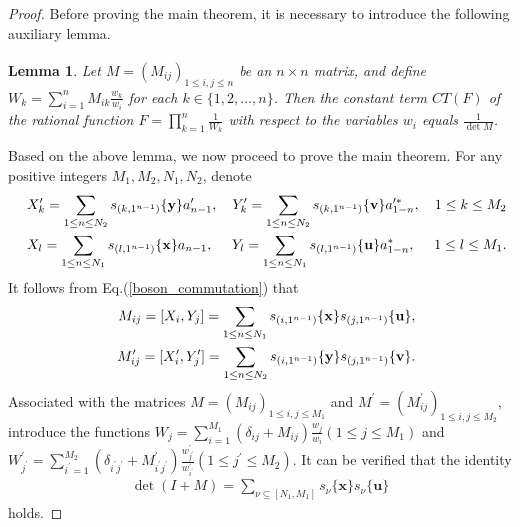 \documentclass[10pt,a4paper]{amsart}
\numberwithin{equation}{section}
\newtheorem{lemma}[theorem]{Lemma}
\begin{document}
\begin{proof}
Before proving the main theorem,  it is necessary to introduce the following auxiliary lemma.
\begin{lemma}\textsuperscript{\cite{bosoncorreclation}}
Let $M=(M_{ij})_{1\leq i,j\leq n}$ be an $n\times n$ matrix, and define $W_{k}=\sum\limits^{n}_{i=1}M_{ik}\frac{w_{k}}{w_{i}}$ for each $k\in\{1,2,\ldots,n\}$. Then the constant term $CT(F)$ of  the rational function $F=\prod\limits^{n}_{k=1}\frac{1}{W_{k}}$  with respect to the variables $w_{i}$ equals $\frac{1}{\det M}$.
\end{lemma}
Based on the above lemma, we now proceed to prove the main theorem. For any positive integers $M_{1}, M_{2},N_{1}, N_{2}$, denote
\begin{eqnarray}
&&X^{\prime}_{k}=\sum\limits_{1\leq n\leq N_{2}}s_{(k,1^{n-1})}\{\mathbf{y}\}a^{\prime}_{n-1},\quad Y^{\prime}_{k}=\sum\limits_{1\leq n\leq N_{2}}s_{(k,1^{n-1})}\{\mathbf{v}\}a^{\prime\ast}_{1-n}
,\quad 1\leq k\leq M_{2}\notag\\
&&X_{l}=\sum\limits_{1\leq n\leq N_{1}}s_{(l,1^{n-1})}\{\mathbf{x}\}a_{n-1},\quad \ Y_{l}=\sum\limits_{1\leq n\leq N_{1}}s_{(l,1^{n-1})}\{\mathbf{u}\}a^{\ast}_{1-n},\quad \ 1\leq l\leq M_{1}.
\end{eqnarray}
It follows from Eq.(\ref{boson_commutation}) that
\begin{eqnarray}
&&M_{ij}=[X_{i},Y_{j}]=\sum\limits_{1\leq n\leq N_{1}}s_{(i,1^{n-1})}\{\mathbf{x}\}s_{(j,1^{n-1})}\{\mathbf{u}\},\notag\\
&&M^{\prime}_{ij}=[X^{\prime}_{i},Y^{\prime}_{j}]=\sum\limits_{1\leq n\leq N_{2}}s_{(i,1^{n-1})}\{\mathbf{y}\}s_{(j,1^{n-1})}\{\mathbf{v}\}.
\end{eqnarray}
Associated with the matrices $M=(M_{ij})_{1\leq i,j\leq M_{1}}$ and $M^{\prime}=(M^{\prime}_{ij})_{1\leq i,j\leq M_{2}}$, introduce the functions
$W_{j}=\sum\limits^{M_{1}}_{i=1}\left(\delta_{ij}+M_{ij}\right)\frac{w_{j}}{w_{i}}(1\leq j\leq M_{1})$ and $W^{\prime}_{j^{\prime}}=\sum\limits^{M_{2}}_{i^{\prime}=1}
\left(\delta_{i^{\prime}j^{\prime}}+M^{\prime}_{i^{\prime}j^{\prime}}\right)
\frac{w^{\prime}_{j^{\prime}}}{w^{\prime}_{i^{\prime}}}(1\leq j^{\prime}\leq M_{2})$. It can be verified that the identity
\begin{eqnarray}
\det(I+M)=\sum\limits_{\nu\subseteq[N_{1},M_{1}]}s_{\nu}\{\mathbf{x}\}
s_{\nu}\{\mathbf{u}\}
\end{eqnarray}
holds.



\end{proof}
\end{document}
